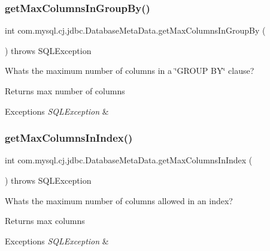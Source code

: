 \subsubsection{\texorpdfstring{get\+Max\+Columns\+In\+Group\+By()}{getMaxColumnsInGroupBy()}}
{\footnotesize\ttfamily int com.\+mysql.\+cj.\+jdbc.\+Database\+Meta\+Data.\+get\+Max\+Columns\+In\+Group\+By (\begin{DoxyParamCaption}{ }\end{DoxyParamCaption}) throws S\+Q\+L\+Exception}

What\textquotesingle{}s the maximum number of columns in a \char`\"{}\+G\+R\+O\+U\+P B\+Y\char`\"{} clause?

\begin{DoxyReturn}{Returns}
max number of columns 
\end{DoxyReturn}

\begin{DoxyExceptions}{Exceptions}
{\em S\+Q\+L\+Exception} & \\
\hline
\end{DoxyExceptions}
\mbox{\label{classcom_1_1mysql_1_1cj_1_1jdbc_1_1_database_meta_data_a2876875ffdff9b0958a67a9df4e6c3d4}} 
\subsubsection{\texorpdfstring{get\+Max\+Columns\+In\+Index()}{getMaxColumnsInIndex()}}
{\footnotesize\ttfamily int com.\+mysql.\+cj.\+jdbc.\+Database\+Meta\+Data.\+get\+Max\+Columns\+In\+Index (\begin{DoxyParamCaption}{ }\end{DoxyParamCaption}) throws S\+Q\+L\+Exception}

What\textquotesingle{}s the maximum number of columns allowed in an index?

\begin{DoxyReturn}{Returns}
max columns 
\end{DoxyReturn}

\begin{DoxyExceptions}{Exceptions}
{\em S\+Q\+L\+Exception} & \\
\hline
\end{DoxyExceptions}
\mbox{\label{classcom_1_1mysql_1_1cj_1_1jdbc_1_1_database_meta_data_a36493a3ec90362550c8073060f09975e}} 
